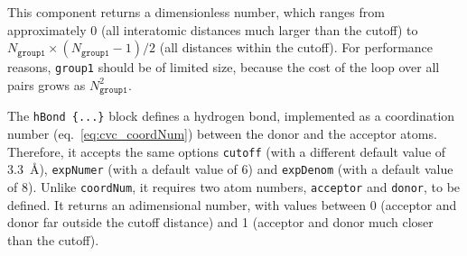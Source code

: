 \begin{cvcoptions}
\item %
\item %
\item %
\item %
\item %
\item %
\item %
\end{cvcoptions}

This component returns a dimensionless number, which ranges from
approximately 0 (all interatomic distances much larger than the
cutoff) to $N_{\mathtt{group1}} \times (N_{\mathtt{group1}} - 1) / 2$ (all
distances within the cutoff).  For performance reasons,
\texttt{group1} should be of limited size, because the cost of the
loop over all pairs grows as $N_{\mathtt{group1}}^2$.




The \texttt{hBond \{...\}} block defines a hydrogen
bond, implemented as a coordination number (eq.~\ref{eq:cvc_coordNum})
between the donor and the acceptor atoms.  Therefore, it accepts the
same options \texttt{cutoff} (with a different default value of
3.3~\AA{}), \texttt{expNumer} (with a default value of 6) and
\texttt{expDenom} (with a default value of 8).  Unlike
\texttt{coordNum}, it requires two atom numbers, \texttt{acceptor} and
\texttt{donor}, to be defined.  It returns an adimensional number,
with values between 0 (acceptor and donor far outside the cutoff
distance) and 1 (acceptor and donor much closer than the cutoff).

